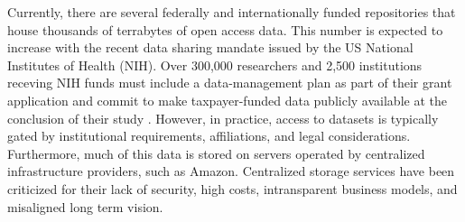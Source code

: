 \documentclass[conference]{IEEEtran}
\begin{document}


Currently, there are several federally and internationally funded repositories that house thousands of terrabytes of open access data. This number is expected to increase with the recent data sharing mandate issued by the US National Institutes of Health (NIH). Over 300,000 researchers and 2,500 institutions receving NIH funds must include a data-management plan as part of their grant application and commit to make taxpayer-funded data publicly available at the conclusion of their study \cite{Kozlov2022}. However, in practice, access to datasets is typically gated by institutional requirements, affiliations, and legal considerations. Furthermore, much of this data is stored on servers operated by centralized infrastructure providers, such as Amazon. Centralized storage services have been criticized for their lack of security, high costs, intransparent business models, and misaligned long term vision. 
\end{document}
